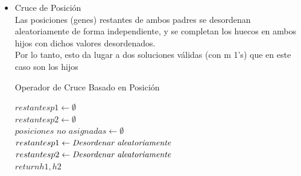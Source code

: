 \documentclass{article}
\begin{document}
\begin{itemize}
\item Cruce de Posición\\
Las posiciones (genes) restantes de ambos padres se desordenan aleatoriamente de forma independiente, y se completan 
los huecos en ambos hijos con dichos valores desordenados. \\
Por lo tanto, esto da lugar a dos soluciones válidas (con m 1's) que en este caso 
son los hijos 

\begin{algorithm}[H]
  \scriptsize
  \label{Operador de Cruce Basado en Posicion}
  \caption{Operador de Cruce Basado en Posición}
\vspace{3mm}

$restantesp1 \leftarrow \emptyset $\\
$restantesp2 \leftarrow \emptyset $\\
$posiciones$ $no$ $asignadas \leftarrow \emptyset $\\
\vspace{3mm}
$restantesp1 \leftarrow \emph{Desordenar aleatoriamente} $\\
$restantesp2 \leftarrow \emph{Desordenar aleatoriamente} $\\

\vspace{3mm}
\vspace{3mm}
$return h1,h2 $\\


\end{algorithm}
\end{itemize}
\end{document}
